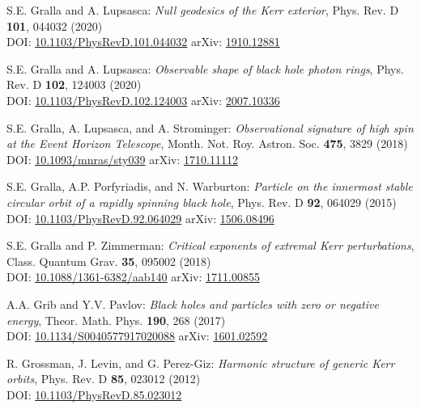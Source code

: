 \begin{thebibliography}{123}
S.E. Gralla and A. Lupsasca:
{\em Null geodesics of the Kerr exterior},
Phys. Rev. D {\bf 101}, 044032 (2020)\\
DOI: \href{https://doi.org/10.1103/PhysRevD.101.044032}{10.1103/PhysRevD.101.044032}\hfill
arXiv: \href{https://arxiv.org/abs/1910.12881}{1910.12881}

S.E. Gralla and A. Lupsasca:
{\em Observable shape of black hole photon rings},
Phys. Rev. D {\bf 102}, 124003 (2020)\\
DOI: \href{https://doi.org/10.1103/PhysRevD.102.124003}{10.1103/PhysRevD.102.124003}\hfill
arXiv: \href{https://arxiv.org/abs/2007.10336}{2007.10336}

S.E. Gralla, A. Lupsasca, and A. Strominger:
{\em Observational signature of high spin at the Event Horizon Telescope},
Month. Not. Roy. Astron. Soc. {\bf 475}, 3829 (2018)\\
DOI: \href{https://doi.org/10.1093/mnras/sty039}{10.1093/mnras/sty039}\hfill
arXiv: \href{https://arxiv.org/abs/1710.11112}{1710.11112}

S.E. Gralla, A.P. Porfyriadis, and N. Warburton:
{\em Particle on the innermost stable circular orbit of a rapidly spinning black hole},
Phys. Rev. D {\bf 92}, 064029 (2015)\\
DOI: \href{https://doi.org/10.1103/PhysRevD.92.064029}{10.1103/PhysRevD.92.064029}\hfill
arXiv: \href{https://arxiv.org/abs/1506.08496}{1506.08496}

S.E. Gralla and P. Zimmerman:
{\em Critical exponents of extremal Kerr perturbations},
Class. Quantum Grav. {\bf 35}, 095002 (2018)\\
DOI: \href{https://doi.org/10.1088/1361-6382/aab140}{10.1088/1361-6382/aab140}\hfill
arXiv: \href{https://arxiv.org/abs/1711.00855}{1711.00855}

A.A. Grib and Y.V. Pavlov:
{\em Black holes and particles with zero or negative energy},
Theor. Math. Phys. {\bf 190}, 268 (2017)\\
DOI: \href{https://doi.org/10.1134/S0040577917020088}{10.1134/S0040577917020088}\hfill
arXiv: \href{https://arxiv.org/abs/1601.02592}{1601.02592}

R. Grossman, J. Levin, and G. Perez-Giz:
{\em Harmonic structure of generic Kerr orbits},
Phys. Rev. D {\bf 85}, 023012 (2012)\\
DOI: \href{https://doi.org/10.1103/PhysRevD.85.023012}{10.1103/PhysRevD.85.023012}


\end{thebibliography}
